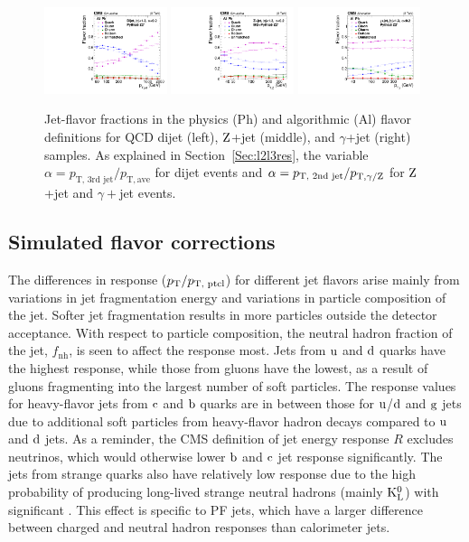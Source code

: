 \documentclass[11pt,twoside,a4paper,cmspaper,final,collab]{cms-tdr}
\begin{document}
\begin{figure}[htbp!]
\centering
\includegraphics[width=0.32\textwidth]{Figure_028-a.pdf}
\includegraphics[width=0.32\textwidth]{Figure_028-b.pdf}
\includegraphics[width=0.32\textwidth]{Figure_028-c.pdf}
\caption{\label{fig:flavorfractions}
Jet-flavor fractions in the physics (Ph) and algorithmic (Al) flavor definitions for QCD dijet (left), $\mathrm{Z}$+jet (middle), and $\gamma$+jet (right) samples. As explained in Section~\ref{Sec:l2l3res}, the variable $\alpha=p_\text{T, 3rd jet}/p_\mathrm{T, ave}$ for dijet events and $\alpha=p_\text{T, 2nd jet}/p_{\mathrm{T}, \gamma/\mathrm{Z}}$ for $\mathrm{Z}$+jet and $\gamma+$jet events.}
\end{figure}

\subsection{Simulated flavor corrections}

The differences in response ($p_{\mathrm{T}}/p_\text{T, ptcl}$) for different jet flavors arise mainly from variations in jet fragmentation energy and variations in particle composition of the jet. Softer jet fragmentation results in more particles outside the detector acceptance. With respect to particle composition, the neutral hadron fraction of the jet, $f_\mathrm{nh}$, is seen to affect the response most.
Jets from $\mathrm{u}$ and $\mathrm{d}$ quarks have the highest response, while those from gluons have the lowest, as a result of gluons fragmenting into the largest number of soft particles.
The response values for heavy-flavor jets from $\mathrm{c}$ and $\mathrm{b}$ quarks are in between those for $\mathrm{u}$/$\mathrm{d}$ and $\mathrm{g}$ jets due to additional soft particles from heavy-flavor hadron decays compared to $\mathrm{u}$ and $\mathrm{d}$ jets. As a reminder, the CMS definition of jet energy response $R$ excludes neutrinos, which would otherwise lower $\mathrm{b}$ and $\mathrm{c}$ jet response significantly.
The jets from strange quarks also have relatively low response due to the high probability of producing long-lived strange neutral hadrons (mainly $\mathrm{K^0_L}$) with significant \pt. This effect is specific to PF jets, which have a larger difference between charged and neutral hadron responses than calorimeter jets.
\end{document}
